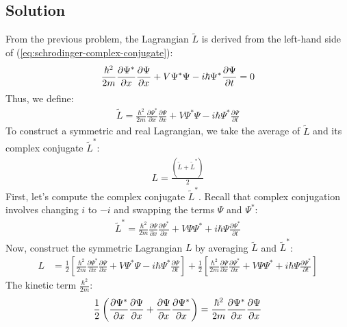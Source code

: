 \begin{enumerate}
    \section*{Solution}
    From the previous problem, the Lagrangian $\tilde{L}$ is derived from the left-hand side of (\ref{eq:schrodinger-complex-conjugate}):
    \begin{align}
        \frac{\hbar^2}{2m} \frac{\partial \Psi^*}{\partial x} \frac{\partial \Psi}{\partial x} + V\Psi^*\Psi - i\hbar \Psi^* \frac{\partial \Psi}{\partial t} = 0\notag
    \end{align}
    Thus, we define:
    \begin{align}
        \tilde{L} = \frac{\hbar^2}{2m} \frac{\partial \Psi^*}{\partial x} \frac{\partial \Psi}{\partial x} + V\Psi^*\Psi - i\hbar \Psi^* \frac{\partial \Psi}{\partial t}
    \end{align}
    To construct a symmetric and real Lagrangian, we take the average of $\tilde{L}$ and its complex conjugate $\tilde{L}^*$:
    \begin{align}
        L = \frac{(\tilde{L} + \tilde{L}^*)}{2}
    \end{align}
    First, let's compute the complex conjugate $\tilde{L}^*$. Recall that complex conjugation involves changing $i$ to $-i$ and swapping the terms $\Psi$ and $\Psi^*$:
    \begin{align}
        \tilde{L}^* = \frac{\hbar^2}{2m} \frac{\partial \Psi}{\partial x} \frac{\partial \Psi^*}{\partial x} + V\Psi\Psi^* + i\hbar \Psi \frac{\partial \Psi^*}{\partial t}
    \end{align}
    Now, construct the symmetric Lagrangian $L$ by averaging $\tilde{L}$ and $\tilde{L}^*$:
    \begin{align}
        L &= \frac{1}{2} \left[ \frac{\hbar^2}{2m} \frac{\partial \Psi^*}{\partial x} \frac{\partial \Psi}{\partial x} + V\Psi^*\Psi - i\hbar \Psi^* \frac{\partial \Psi}{\partial t} \right] + \frac{1}{2} \left[ \frac{\hbar^2}{2m} \frac{\partial \Psi}{\partial x} \frac{\partial \Psi^*}{\partial x} + V\Psi\Psi^* + i\hbar \Psi \frac{\partial \Psi^*}{\partial t} \right]\label{eq:symmetric-lagrangian}
    \end{align}
    The kinetic term $\displaystyle\frac{\hbar^2}{2m}$:
    \begin{align}
        \frac{1}{2} \left( \frac{\partial \Psi^*}{\partial x} \frac{\partial \Psi}{\partial x} + \frac{\partial \Psi}{\partial x} \frac{\partial \Psi^*}{\partial x} \right) = \frac{\hbar^2}{2m} \frac{\partial \Psi^*}{\partial x} \frac{\partial \Psi}{\partial x}\notag

\end{align}
\end{enumerate}
